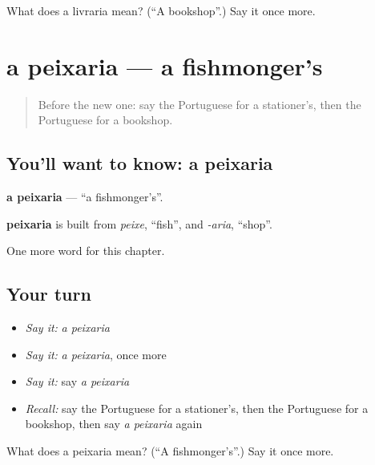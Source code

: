 \begin{tcolorbox}[breakable,colback=teal!4,colframe=teal!35!black,title={Before you move on}]
What does a livraria mean? (\textquotedblleft{}A bookshop\textquotedblright{}.) Say it once more.
\end{tcolorbox}
\section[a peixaria]{a peixaria — a fishmonger's}

\label{lesson:PT-C227-peixaria}



\begin{quote}
Before the new one: say the Portuguese for a stationer's, then the Portuguese for a bookshop.
\end{quote}

\subsection*{You'll want to know: a peixaria}
\textbf{a peixaria} — \textquotedblleft{}a fishmonger's\textquotedblright{}.

\begin{cousinweb}
\textbf{peixaria} is built from \emph{peixe}, \textquotedblleft{}fish\textquotedblright{}, and \emph{-aria}, \textquotedblleft{}shop\textquotedblright{}.
\end{cousinweb}

\begin{grammarlens}[title={What you've built}]
One more word for this chapter.
\end{grammarlens}

\subsection*{Your turn}
\begin{itemize}
\raggedright
  \item \emph{Say it:} \emph{a peixaria}
  \item \emph{Say it:} \emph{a peixaria}, once more
  \item \emph{Say it:} say \emph{a peixaria}
  \item \emph{Recall:} say the Portuguese for a stationer's, then the Portuguese for a bookshop, then say \emph{a peixaria} again
\end{itemize}

\begin{tcolorbox}[breakable,colback=teal!4,colframe=teal!35!black,title={Before you move on}]
What does a peixaria mean? (\textquotedblleft{}A fishmonger's\textquotedblright{}.) Say it once more.
\end{tcolorbox}
